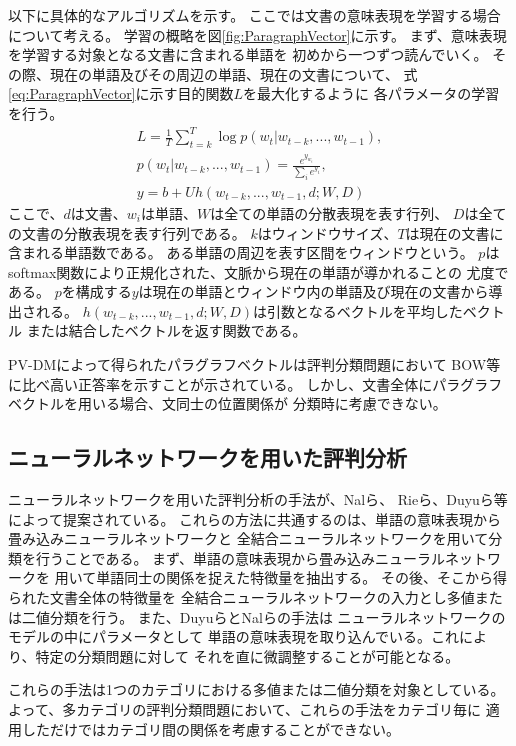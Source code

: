 以下に具体的なアルゴリズムを示す。
ここでは文書の意味表現を学習する場合について考える。
学習の概略を図\ref{fig:ParagraphVector}に示す。
まず、意味表現を学習する対象となる文書に含まれる単語を
初めから一つずつ読んでいく。
その際、現在の単語及びその周辺の単語、現在の文書について、
式\ref{eq:ParagraphVector}に示す目的関数$L$を最大化するように
各パラメータの学習を行う。
\begin{gather}
  L = \frac{1}{T} \sum^{T}_{t = k} \log p(w_t | w_{t-k}, ..., w_{t-1}),
    \label{eq:ParagraphVector} \\
  p(w_t | w_{t-k}, ..., w_{t-1}) = \frac{e^{y_{w_t}}}{\sum_i e^{y_i}},
    \nonumber \\
  y = b + Uh(w_{t-k}, ..., w_{t-1}, d; W, D) \nonumber
\end{gather}
ここで、$d$は文書、$w_i$は単語、$W$は全ての単語の分散表現を表す行列、
$D$は全ての文書の分散表現を表す行列である。
$k$はウィンドウサイズ、$T$は現在の文書に含まれる単語数である。
ある単語の周辺を表す区間をウィンドウという。
$p$はsoftmax関数により正規化された、文脈から現在の単語が導かれることの
尤度である。
$p$を構成する$y$は現在の単語とウィンドウ内の単語及び現在の文書から導出される。
$h(w_{t-k}, ..., w_{t-1}, d; W, D)$は引数となるベクトルを平均したベクトル
または結合したベクトルを返す関数である。

PV-DMによって得られたパラグラフベクトルは評判分類問題において
BOW等に比べ高い正答率を示すことが示されている。
しかし、文書全体にパラグラフベクトルを用いる場合、文同士の位置関係が
分類時に考慮できない。


\subsection{ニューラルネットワークを用いた評判分析}

ニューラルネットワークを用いた評判分析の手法が、Nalら\cite{nal14}、
Rieら\cite{rie14}、Duyuら\cite{duyu15}等によって提案されている。
これらの方法に共通するのは、単語の意味表現から畳み込みニューラルネットワークと
全結合ニューラルネットワークを用いて分類を行うことである。
まず、単語の意味表現から畳み込みニューラルネットワークを
用いて単語同士の関係を捉えた特徴量を抽出する。
その後、そこから得られた文書全体の特徴量を
全結合ニューラルネットワークの入力とし多値または二値分類を行う。
また、Duyuら\cite{duyu15}とNalら\cite{nal14}の手法は
ニューラルネットワークのモデルの中にパラメータとして
単語の意味表現を取り込んでいる。これにより、特定の分類問題に対して
それを直に微調整することが可能となる。

これらの手法は1つのカテゴリにおける多値または二値分類を対象としている。
よって、多カテゴリの評判分類問題において、これらの手法をカテゴリ毎に
適用しただけではカテゴリ間の関係を考慮することができない。
